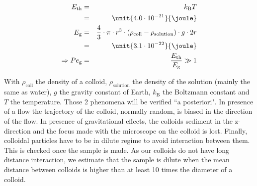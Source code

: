 \documentclass[%
 aip,
 jmp,%
 amsmath,amssymb,
reprint,%
]{revtex4-1}
\begin{document}
\begin{eqnarray}
E_\text{th} &=& k_\text{B} T\\ \nonumber
&=& \unit{4.0\cdot10^{-21}}{\joule} \\ \nonumber
E_\text{g} &=& \frac{4}{3} \cdot \pi \cdot r^3 \cdot (\rho_\text{coll} - \rho_\text{solution})\cdot g \cdot 2r \nonumber \\ \nonumber
&=& \unit{3.1\cdot10^{-22}}{\joule} \\ \nonumber
\Rightarrow Pe_\text{g} &=& \frac{E_\text{th}}{E_\text{g}} \gg 1 \nonumber
\end{eqnarray}

With $\rho_\text{coll}$ the density of a colloid, $\rho_\text{solution}$ the density of the solution (mainly the same as water), $g$ the gravity constant of Earth, $k_\text{B}$ the Boltzmann constant and $T$ the temperature. Those 2 phenomena will be verified ``a posteriori". In presence of a flow the trajectory of the colloid, normally random, is biased in the direction of the flow. In presence of gravitational effects, the colloids sediment in the z-direction and the focus made with the microscope on the colloid is lost. Finally, colloidal particles have to be in dilute regime to avoid interaction between them. This is checked once the sample is made. As our colloids do not have long distance interaction, we estimate that the sample is dilute when the mean distance between colloids is higher than at least 10 times the diameter of a colloid.
\end{document}

